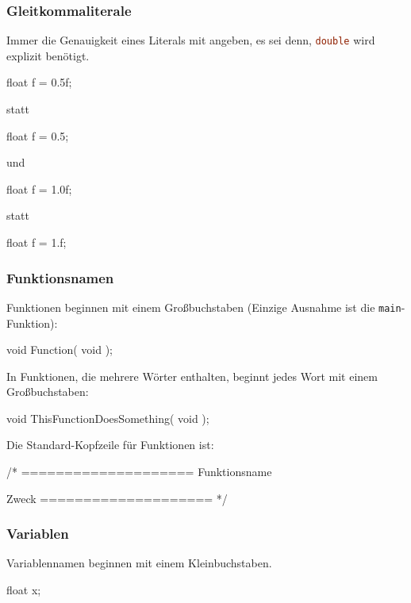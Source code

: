 \documentclass{homework-pp}
\renewcommand{\c}[1]{\lstinline[language=c,basicstyle=\ttfamily]|#1|}
\begin{document}
\subsubsection{Gleitkommaliterale}

Immer die Genauigkeit eines Literals mit angeben, es sei denn, \c{double} wird explizit benötigt.

\begin{cblock}
float f = 0.5f;
\end{cblock}
statt
\begin{cblock}
float f = 0.5;
\end{cblock}

und

\begin{cblock}
float f = 1.0f;
\end{cblock}
statt
\begin{cblock}
float f = 1.f;
\end{cblock}

\subsubsection{Funktionsnamen}

Funktionen beginnen mit einem Großbuchstaben (Einzige Ausnahme ist die \c{main}-Funktion):

\begin{cblock}
void Function( void );
\end{cblock}

In Funktionen, die mehrere Wörter enthalten, beginnt jedes Wort mit einem Großbuchstaben:

\begin{cblock}
void ThisFunctionDoesSomething( void );
\end{cblock}

Die Standard-Kopfzeile für Funktionen ist:

\begin{cblock}
/*
====================
Funktionsname

Zweck
====================
*/
\end{cblock}

\subsubsection{Variablen}

Variablennamen beginnen mit einem Kleinbuchstaben.

\begin{cblock}
float x;
\end{cblock}
\end{document}
